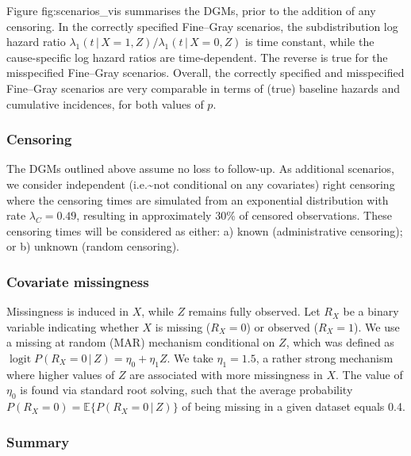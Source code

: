 \documentclass[
  letterpaper,
  DIV=11,
  numbers=noendperiod]{scrreprt}
\DeclareMathOperator{\logit}{logit}
\newcommand{\given}{\,|\,}
\begin{document}
Figure fig:scenarios\_vis summarises the DGMs, prior to the addition of
any censoring. In the correctly specified Fine--Gray scenarios, the
subdistribution log hazard ratio
\(\lambda_1(t \given X = 1, Z)/\lambda_1(t \given X = 0, Z)\) is time
constant, while the cause-specific log hazard ratios are time-dependent.
The reverse is true for the misspecified Fine--Gray scenarios. Overall,
the correctly specified and misspecified Fine--Gray scenarios are very
comparable in terms of (true) baseline hazards and cumulative
incidences, for both values of \(p\).

\hypertarget{censoring}{%
\subsubsection{Censoring}\label{censoring}}

The DGMs outlined above assume no loss to follow-up. As additional
scenarios, we consider independent (i.e.\textasciitilde not conditional
on any covariates) right censoring where the censoring times are
simulated from an exponential distribution with rate
\(\lambda_C = 0.49\), resulting in approximately 30\% of censored
observations. These censoring times will be considered as either: a)
known (administrative censoring); or b) unknown (random censoring).

\hypertarget{covariate-missingness}{%
\subsubsection{Covariate missingness}\label{covariate-missingness}}

Missingness is induced in \(X\), while \(Z\) remains fully observed. Let
\(R_X\) be a binary variable indicating whether \(X\) is missing
(\(R_X = 0\)) or observed (\(R_X = 1\)). We use a missing at random
(MAR) mechanism conditional on \(Z\), which was defined as
\(\logit P(R_X = 0 \given Z) = \eta_0 + \eta_1 Z\). We take
\(\eta_1 = 1.5\), a rather strong mechanism where higher values of \(Z\)
are associated with more missingness in \(X\). The value of \(\eta_0\)
is found via standard root solving, such that the average probability
\(P(R_X = 0) = \mathbb{E}\{P(R_X = 0 \given Z)\}\) of being missing in a
given dataset equals 0.4.

\hypertarget{summary}{%
\subsubsection{Summary}\label{summary}}
\end{document}
